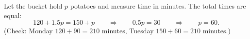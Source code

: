 Let the bucket hold $p$ potatoes and measure time in minutes. The total times are equal:
\[
120+1.5p=150+p\qquad\Longrightarrow\qquad0.5p=30\qquad\Longrightarrow\qquad p=\boxed{60}.
\]
(Check: Monday $120+90=210$ minutes, Tuesday $150+60=210$ minutes.)
